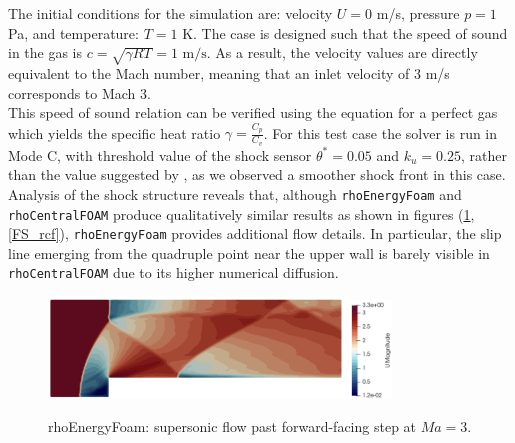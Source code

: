 \documentclass[a5paper]{sapthesis}
\begin{document}
	\noindent The initial conditions for the simulation are: velocity  $U = 0$ m/s, pressure $p = 1$ Pa, and temperature: $T = 1$ K. The case is designed such that the speed of sound in the gas is	$c = \sqrt{\gamma R T} = 1 \text{ m/s}$. As a result, the velocity values are directly equivalent to the Mach number, meaning that an inlet velocity of 3 m/s corresponds to Mach 3.
	\\
	This speed of sound relation can be verified using the equation for a perfect gas which yields the specific heat ratio $\gamma = \frac{C_p}{C_v}$. 
	For this test case the solver is run in Mode C, with threshold
	value of the shock sensor $\theta^* = 0.05$ and $k_u = 0.25$, rather than the value suggested by \citet{LIOU_AUSM+-up}, as we observed a smoother shock front in this case.
	Analysis of the shock structure reveals that, although \texttt{rhoEnergyFoam} and \texttt{rhoCentralFOAM} produce qualitatively similar results as shown in figures (\ref{FS_ref}, \ref{FS_rcf}), \texttt{rhoEnergyFoam} provides additional flow details. In particular, the slip line emerging from the quadruple point near the upper wall is barely visible in \texttt{rhoCentralFOAM} due to its higher numerical diffusion.
			
	\begin{figure}
		\centering
		\subfloat
		{\includegraphics[width=0.7\textwidth]{Figures/FS_velocity}} \quad 
		\subfloat
		\centering
		{\includegraphics[width=0.1\textwidth, height=0.16\textheight]{Figures/FS_velocitybar}}
		\caption{rhoEnergyFoam: supersonic ﬂow past forward-facing step at $Ma = 3$.}
		\label{FS_ref}
	\end{figure}
	
\end{document}
